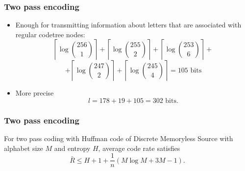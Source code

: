 \documentclass[14pt]{beamer}
\begin{document}
\begin{frame}
\frametitle{Two pass encoding}
\begin{itemize}    

    \item Enough for transmitting information about letters that are associated with regular codetree nodes:
    \[
    \left\lceil \log \binom {256} 1 \right\rceil +%
    \left\lceil \log \binom {255} 2 \right\rceil +%
    \left\lceil \log \binom {253} 6 \right\rceil +%
    \]
    \[
    +
    \left\lceil \log \binom {247} 2 \right\rceil +%
    \left\lceil \log \binom {245} 4 \right\rceil =105 \text{~bits}
    \]
    
    \item More precise 
    \begin{equation}
    \label{eq3_16} l = 178 + 19 + 105 = 302\text{~bits} .
    \end{equation}
    
\end{itemize}
\end{frame}


\begin{frame}
\frametitle{Two pass encoding}

    \begin{theorem} \label{th_two_pass}
    For two pass coding with Huffman code of Discrete Memoryless Source with alphabet size $M$ and entropy $H$, average code rate satisfies
    \begin{equation}
    \label{eq3_17} \bar {R} \le H + 1 + \frac{1}{n}\left( {M\log M + 3M - 1} \right).
    \end{equation}
    \end{theorem}

\end{frame}
\end{document}
